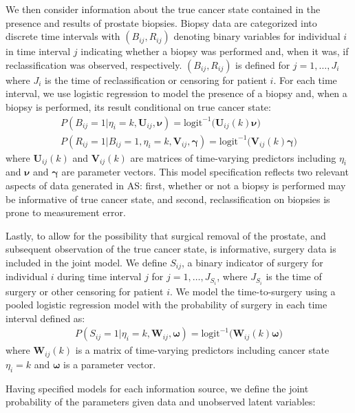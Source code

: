 \documentclass[12pt, letterpaper]{article}
\newcommand{\bmnu}{\boldsymbol{\nu}}
\newcommand{\bmgamma}{\boldsymbol{\gamma}}
\newcommand{\bmomega}{\boldsymbol{\omega}}
\newcommand{\bmV}{\mathbf{V}}
\newcommand{\bmW}{\mathbf{W}}
\newcommand{\bmU}{\mathbf{U}}
\newcommand{\bea}{\begin{eqnarray}}
\newcommand{\eea}{\end{eqnarray}}
\newcommand{\beas}{\begin{eqnarray*}}
\newcommand{\eeas}{\end{eqnarray*}}
\begin{document}
We then consider information about the true cancer state contained in the presence and results of prostate biopsies. Biopsy data are categorized into discrete time intervals with $(B_{ij}, R_{ij})$ denoting binary variables for individual $i$ in time interval $j$ indicating whether a biopsy was performed and, when it was, if reclassification was observed, respectively. $(B_{ij}, R_{ij})$ is defined for $j=1,\dots, J_i$ where $J_i$ is the time of reclassification or censoring for patient $i$. For each time interval, we use logistic regression to model the presence of a biopsy and, when a biopsy is performed, its result conditional on true cancer state:
\bea
\label{eq:p_bx}
P(B_{ij}=1 | \eta_i=k, \bmU_{ij}, \bmnu) = \text{logit}^{-1}\big( \bmU_{ij}(k) \bmnu \big)\\
\label{eq:p_rc}
P(R_{ij}=1 | B_{ij}=1, \eta_i=k, \bmV_{ij}, \bmgamma) = \text{logit}^{-1}\big( \bmV_{ij}(k)\bmgamma \big)
\eea
where $\bmU_{ij}(k)$ and $\bmV_{ij}(k)$ are matrices of time-varying predictors including $\eta_i$ and $\bmnu$ and $\bmgamma$ are parameter vectors. This model specification reflects two relevant aspects of data generated in AS: first, whether or not a biopsy is performed may be informative of true cancer state, and second, reclassification on biopsies is prone to measurement error.

Lastly, to allow for the possibility that surgical removal of the prostate, and subsequent observation of the true cancer state, is informative, surgery data is included in the joint model. We define $S_{ij}$, a binary indicator of surgery for individual $i$ during time interval $j$ for $j=1,\dots,J_{S_i}$, where $J_{S_i}$ is the time of surgery or other censoring for patient $i$. We model the time-to-surgery using a pooled logistic regression model with the probability of surgery in each time interval defined as:
\beas
P(S_{ij}=1 | \eta_i=k, \bmW_{ij}, \bmomega) = \text{logit}^{-1}\big( \bmW_{ij}(k)\bmomega \big)
\eeas
where $\bmW_{ij}(k)$ is a matrix of time-varying predictors including cancer state $\eta_i=k$ and $\bmomega$ is a parameter vector. 


Having specified models for each information source, we define the joint probability of the parameters given data and unobserved latent variables:
\end{document}
